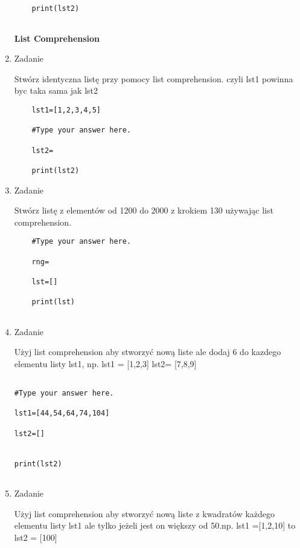 \documentclass[11pt]{article}
\begin{document}
\begin{enumerate}
\begin{lstlisting}
	
	
	print(lst2)
	
\end{lstlisting}
\medskip
\begin{Large}
	\textbf{List Comprehension}
\end{Large}
\item 
\begin{Large}
	Zadanie
\end{Large}
\par
Stwórz identyczna listę przy pomocy list comprehension. czyli lst1 powinna byc taka sama jak lst2
\begin{lstlisting}
	lst1=[1,2,3,4,5]
	
	#Type your answer here.
	
	lst2=
	
	print(lst2)
\end{lstlisting}

\item 
\begin{Large}
	Zadanie
\end{Large}
\par
Stwórz listę z elementów od 1200 do 2000 z krokiem 130 używając list comprehension.
\begin{lstlisting}
	#Type your answer here.
	
	rng=
	
	lst=[]
	
	print(lst)
	
\end{lstlisting}

\item 
\begin{Large}
	Zadanie
\end{Large}
\par
Użyj list comprehension aby stworzyć nową liste ale dodaj 6 do kazdego elementu listy lst1, np. lst1 = [1,2,3] lst2= [7,8,9] 
\begin{lstlisting}

#Type your answer here.

lst1=[44,54,64,74,104]

lst2=[]


print(lst2)
	
\end{lstlisting}

\item 
\begin{Large}
	Zadanie
\end{Large}
\par
Użyj list comprehension aby stworzyć nową liste z kwadratów każdego elementu listy lst1 ale tylko jeżeli jest on większy od 50.np. lst1 =[1,2,10] to lst2 = [100]
\begin{lstlisting}
	

\end{lstlisting}
\end{enumerate}
\end{document}
